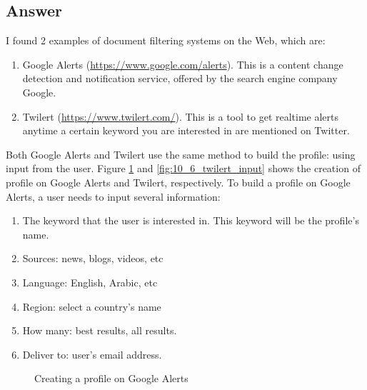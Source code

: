 \documentclass[letterpaper,11pt]{article}
\begin{document}
\subsection*{Answer}
I found 2 examples of document filtering systems on the Web, which are:
\begin{enumerate}
	\item Google Alerts (\url{https://www.google.com/alerts}). This is a content change detection and notification service, offered by the search engine company Google. 
	\item Twilert (\url{https://www.twilert.com/}). This is a tool to get realtime alerts anytime a certain keyword you are interested in are mentioned on Twitter. 
\end{enumerate}

Both Google Alerts and Twilert use the same method to build the profile: using input from the user. Figure \ref{fig:10_6_google_alerts} and \ref{fig:10_6_twilert_input} shows the creation of profile on Google Alerts and Twilert, respectively. \newline
To build a profile on Google Alerts, a user needs to input several information:
\begin{enumerate}
	\item The keyword that the user is interested in. This keyword will be the profile's name. 
	\item Sources: news, blogs, videos, etc
	\item Language: English, Arabic, etc
	\item Region: select a country's name
	\item How many: best results, all results. 
	\item Deliver to: user's email address. 
\end{enumerate}

\begin{figure}[H]
	\centering
	\caption{Creating a profile on Google Alerts}
	\label{fig:10_6_google_alerts}
\end{figure}
\end{document}
